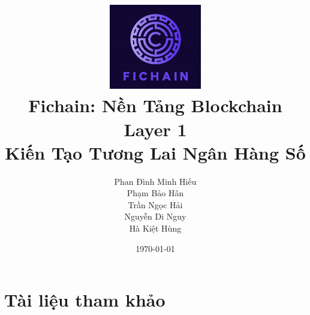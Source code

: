 \documentclass[12pt, a4paper]{article}
\title{
\vspace{-1.5cm}
\includegraphics[width=0.3\textwidth]{logo.png} \\[1em]
Fichain: Nền Tảng Blockchain Layer 1 \\
Kiến Tạo Tương Lai Ngân Hàng Số
}
\author{%
  Phan Đình Minh Hiếu \\
  Phạm Bảo Hân \\
  Trần Ngọc Hải \\
  Nguyễn Di Nguy \\
  Hà Kiệt Hùng
}
\date{\today}
\begin{document}
\maketitle
\thispagestyle{empty}
\newpage

\tableofcontents %
\newpage










\newpage %

\section{Tài liệu tham khảo}
\end{document}
